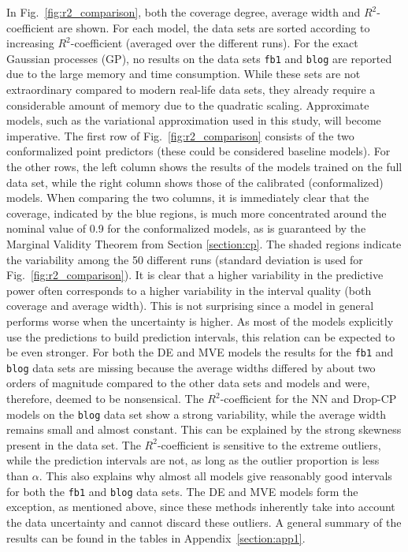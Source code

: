\documentclass[smallcondensed]{svjour3}
\begin{document}
    In Fig.~\ref{fig:r2_comparison}, both the coverage degree, average width and $R^2$-coefficient are shown. For each model, the data sets are sorted according to increasing $R^2$-coefficient (averaged over the different runs). For the exact Gaussian processes (GP), no results on the data sets \texttt{fb1} and \texttt{blog} are reported due to the large memory and time consumption. While these sets are not extraordinary compared to modern real-life data sets, they already require a considerable amount of memory due to the quadratic scaling. Approximate models, such as the variational approximation used in this study, will become imperative. The first row of Fig.~\ref{fig:r2_comparison} consists of the two conformalized point predictors (these could be considered baseline models). For the other rows, the left column shows the results of the models trained on the full data set, while the right column shows those of the calibrated (conformalized) models. When comparing the two columns, it is immediately clear that the coverage, indicated by the blue regions, is much more concentrated around the nominal value of 0.9 for the conformalized models, as is guaranteed by the Marginal Validity Theorem from Section \ref{section:cp}. The shaded regions indicate the variability among the 50 different runs (standard deviation is used for Fig.~\ref{fig:r2_comparison}). It is clear that a higher variability in the predictive power often corresponds to a higher variability in the interval quality (both coverage and average width). This is not surprising since a model in general performs worse when the uncertainty is higher. As most of the models explicitly use the predictions to build prediction intervals, this relation can be expected to be even stronger. For both the DE and MVE models the results for the \texttt{fb1} and \texttt{blog} data sets are missing because the average widths differed by about two orders of magnitude compared to the other data sets and models and were, therefore, deemed to be nonsensical. The $R^2$-coefficient for the NN and Drop-CP models on the \texttt{blog} data set show a strong variability, while the average width remains small and almost constant. This can be explained by the strong skewness present in the data set. The $R^2$-coefficient is sensitive to the extreme outliers, while the prediction intervals are not, as long as the outlier proportion is less than $\alpha$. This also explains why almost all models give reasonably good intervals for both the \texttt{fb1} and \texttt{blog} data sets. The DE and MVE models form the exception, as mentioned above, since these methods inherently take into account the data uncertainty and cannot discard these outliers. A general summary of the results can be found in the tables in Appendix~\ref{section:app1}.
\end{document}
